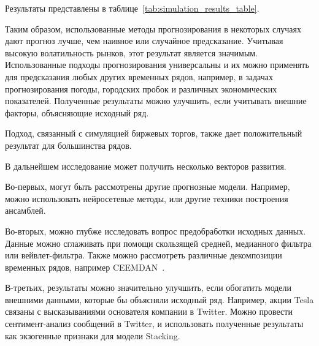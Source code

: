 \documentclass[a4paper,article,14pt]{extarticle}
\begin{document}
Результаты представлены в таблице~\ref{tab:simulation_results_table}.


\pagebreak
{}

Таким образом, использованные методы прогнозирования в некоторых случаях дают прогноз лучше, чем наивное или случайное предсказание.
Учитывая высокую волатильность рынков, этот результат является значимым.
Использованные подходы прогнозирования универсальны и их можно применять для предсказания любых других временных рядов, например, в задачах прогнозирования погоды, городских пробок и различных экономических показателей.
Полученные результаты можно улучшить, если учитывать внешние факторы, объясняющие исходный ряд.

\par
Подход, связанный с симуляцией биржевых торгов, также дает положительный результат для большинства рядов.

\par
В дальнейшем исследование может получить несколько векторов развития.
\par
Во-первых, могут быть рассмотрены другие прогнозные модели.
Например, можно использовать нейросетевые методы, или другие техники построения ансамблей.
\par
Во-вторых, можно глубже исследовать вопрос предобработки исходных данных.
Данные можно сглаживать при помощи скользящей средней, медианного фильтра или вейвлет-фильтра.
Также можно рассмотреть различные декомпозиции временных рядов, например CEEMDAN~\cite{lstm_ex2}.
\par
В-третьих, результаты можно значительно улучшить, если обогатить модели внешними данными, которые бы объясняли исходный ряд.
Например, акции Tesla связаны с высказываниями основателя компании в Twitter.
Можно провести сентимент-анализ сообщений в Twitter, и использовать полученные результаты как экзогенные признаки для модели Stacking.
\end{document}
